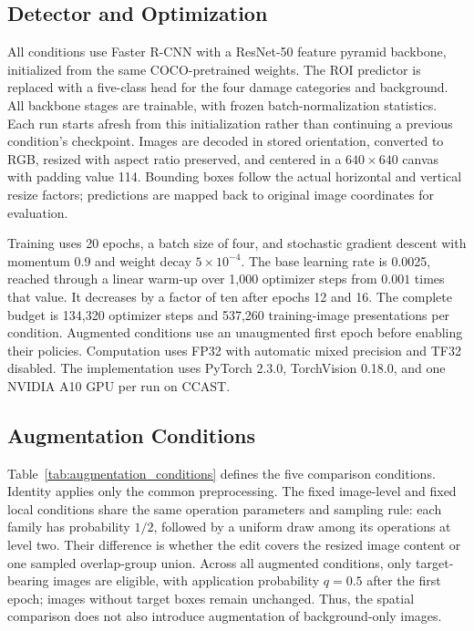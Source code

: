 \documentclass[conference]{IEEEtran}
\begin{document}
\subsection{Detector and Optimization}
\label{sec:setup_detector}
All conditions use Faster R-CNN with a ResNet-50 feature pyramid backbone, initialized from the same COCO-pretrained weights. The ROI predictor is replaced with a five-class head for the four damage categories and background. All backbone stages are trainable, with frozen batch-normalization statistics. Each run starts afresh from this initialization rather than continuing a previous condition's checkpoint. Images are decoded in stored orientation, converted to RGB, resized with aspect ratio preserved, and centered in a $640\times640$ canvas with padding value 114. Bounding boxes follow the actual horizontal and vertical resize factors; predictions are mapped back to original image coordinates for evaluation.

Training uses 20 epochs, a batch size of four, and stochastic gradient descent with momentum 0.9 and weight decay $5\times10^{-4}$. The base learning rate is 0.0025, reached through a linear warm-up over 1,000 optimizer steps from $0.001$ times that value. It decreases by a factor of ten after epochs 12 and 16. The complete budget is 134,320 optimizer steps and 537,260 training-image presentations per condition. Augmented conditions use an unaugmented first epoch before enabling their policies. Computation uses FP32 with automatic mixed precision and TF32 disabled. The implementation uses PyTorch 2.3.0, TorchVision 0.18.0, and one NVIDIA A10 GPU per run on CCAST.

\subsection{Augmentation Conditions}
\label{sec:setup_conditions}
Table~\ref{tab:augmentation_conditions} defines the five comparison conditions. Identity applies only the common preprocessing. The fixed image-level and fixed local conditions share the same operation parameters and sampling rule: each family has probability $1/2$, followed by a uniform draw among its operations at level two. Their difference is whether the edit covers the resized image content or one sampled overlap-group union. Across all augmented conditions, only target-bearing images are eligible, with application probability $q=0.5$ after the first epoch; images without target boxes remain unchanged. Thus, the spatial comparison does not also introduce augmentation of background-only images.
\end{document}
